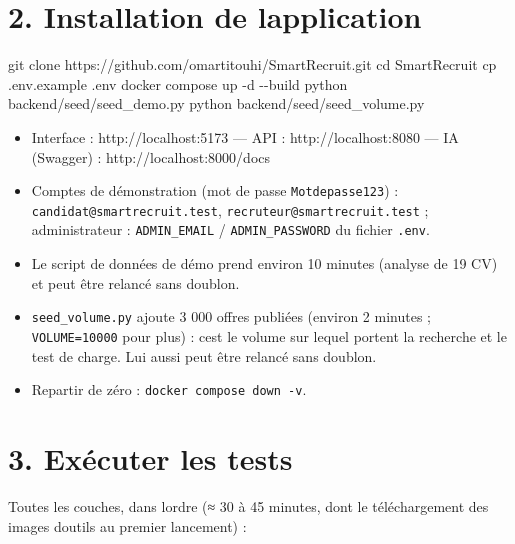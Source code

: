 \documentclass[
  11pt,
]{article}
\newenvironment{Shaded}{}{}
\newcommand{\AttributeTok}[1]{\textcolor[rgb]{0.49,0.56,0.16}{#1}}
\newcommand{\BuiltInTok}[1]{\textcolor[rgb]{0.00,0.50,0.00}{#1}}
\newcommand{\ExtensionTok}[1]{#1}
\newcommand{\FunctionTok}[1]{\textcolor[rgb]{0.02,0.16,0.49}{#1}}
\newcommand{\NormalTok}[1]{#1}
\providecommand{\tightlist}{%
  \setlength{\itemsep}{0pt}\setlength{\parskip}{0pt}}
\begin{document}
\section{2. Installation de
l\textquotesingle application}\label{2-installation-de-lapplication}

\begin{Shaded}
\begin{Highlighting}[]
\FunctionTok{git}\NormalTok{ clone https://github.com/omartitouhi/SmartRecruit.git}
\BuiltInTok{cd}\NormalTok{ SmartRecruit}
\FunctionTok{cp}\NormalTok{ .env.example .env}
\ExtensionTok{docker}\NormalTok{ compose up }\AttributeTok{{-}d} \AttributeTok{{-}{-}build}
\ExtensionTok{python}\NormalTok{ backend/seed/seed\_demo.py}
\ExtensionTok{python}\NormalTok{ backend/seed/seed\_volume.py}
\end{Highlighting}
\end{Shaded}

\begin{itemize}
\tightlist
\item
  Interface : http://localhost:5173 --- API : http://localhost:8080 ---
  IA (Swagger) : http://localhost:8000/docs
\item
  Comptes de démonstration (mot de passe \texttt{Motdepasse123}) :
  \texttt{candidat@smartrecruit.}\allowbreak{}\texttt{test},
  \texttt{recruteur@smartrecruit.}\allowbreak{}\texttt{test} ;
  administrateur : \texttt{ADMIN\_EMAIL} / \texttt{ADMIN\_PASSWORD} du
  fichier \texttt{.env}.
\item
  Le script de données de démo prend environ 10 minutes (analyse de 19
  CV) et peut être relancé sans doublon.
\item
  \texttt{seed\_volume.py} ajoute 3 000 offres publiées (environ 2
  minutes ; \texttt{VOLUME=10000} pour plus) : c\textquotesingle est le
  volume sur lequel portent la recherche et le test de charge. Lui aussi
  peut être relancé sans doublon.
\item
  Repartir de zéro :
  \texttt{docker\ compose\ down\ -}\allowbreak{}\texttt{v}.
\end{itemize}

\section{3. Exécuter les tests}\label{3-exuxe9cuter-les-tests}

Toutes les couches, dans l\textquotesingle ordre (≈ 30 à 45 minutes,
dont le téléchargement des images d\textquotesingle outils au premier
lancement) :
\end{document}

